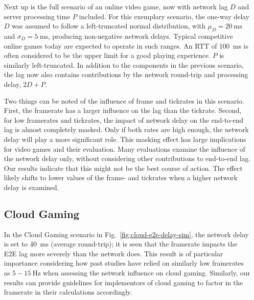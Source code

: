 Next up is the full scenario of an online video game, now with network lag $D$ and server processing time $P$ included. For this exemplary scenario, the one-way delay $D$ was assumed to follow a left-truncated normal distribution, with $\mu_D = \SI{20}{\milli\second}$ and $\sigma_D = \SI{5}{\milli\second}$, producing non-negative network delays. Typical competitive online games today are expected to operate in such ranges. An \acrshort{RTT} of \SI{100}{\milli\second} is often considered to be the upper limit for a good playing experience. $P$ is similarly left-truncated. In addition to the components in the previous scenario, the lag now also contains contributions by the network round-trip and processing delay, $2D + P$.

Two things can be noted of the influence of frame and tickrates in this scenario. First, the framerate has a larger influence on the lag than the tickrate. Second, for low framerates and tickrates, the impact of network delay on the end-to-end lag is almost completely masked. Only if both rates are high enough, the network delay will play a more significant role. This masking effect has large implications for video games and their evaluation. Many evaluations examine the influence of the network delay only, without considering other contributions to end-to-end lag. Our results indicate that this might not be the best course of action. The effect likely shifts to lower values of the frame- and tickrates when a higher network delay is examined. %


\subsection{Cloud Gaming}

 In the Cloud Gaming scenario in Fig.~\ref{fig:cloud-e2e-delay-sim}, the network delay is set to \SI{40}{\milli\second} (average round-trip); it is seen that the framerate impacts the \gls{E2E} lag more severely than the network does. This result is of particular importance considering how past studies have relied on similarly low framerates as $5-\SI{15}{\hertz}$ when assessing the network influence on cloud gaming. Similarly, our results can provide guidelines for implementors of cloud gaming to factor in the framerate in their calculations accordingly.


